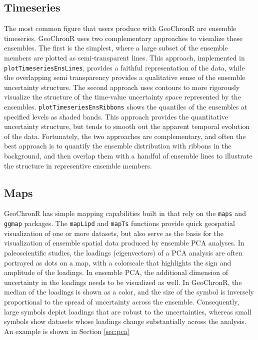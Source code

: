 \documentclass[gchron, manuscript]{copernicus}
\begin{document}
\subsection{Timeseries}

The most common figure that users produce with GeoChronR are ensemble timeseries.
GeoChronR uses two complementary approaches to visualize these ensembles.
The first is the simplest, where a large subset of the ensemble members are plotted as semi-transparent lines.
This approach, implemented in \texttt{plotTimeseriesEnsLines}, provides a faithful representation of the data, while the overlapping semi transparency provides a qualitative sense of the ensemble uncertainty structure.
The second approach uses contours to more rigorously visualize the structure of the time-value uncertainty space represented by the ensembles.
\texttt{plotTimeseriesEnsRibbons} shows the quantiles of the ensembles at specified levels as shaded bands.
This approach provides the quantitative uncertainty structure, but tends to smooth out the apparent temporal evolution of the data.
Fortunately, the two approaches are complementary, and often the best approach is to quantify the ensemble distribution with ribbons in the background, and then overlap them with a handful of ensemble lines to illustrate the structure in representive ensemble members.

\subsection{Maps}

GeoChronR has simple mapping capabilities built in that rely on the \texttt{maps} \citep{maps} and \texttt{ggmap} \citep{ggmap} packages.
The \texttt{mapLipd} and \texttt{mapTs} functions provide quick geospatial visualization of one or more datasets, but also serve as the basis for the visualization of ensemble spatial data produced by ensemble PCA analyses.
In paleoscientific studies, the loadings (eigenvectors) of a PCA analysis are often portrayed as dots on a map, with a colorscale that highlights the sign and amplitude of the loadings.
In ensemble PCA, the additional dimension of uncertainty in the loadings needs to be visualized as well.
In GeoChronR, the median of the loadings is shown as a color, and the size of the symbol is inversely proportional to the spread of uncertainty across the ensemble.
Consequently, large symbols depict loadings that are robust to the uncertainties, whereas small symbols show datasets whose loadings change substantially across the analysis.
An example is shown in Section \ref{sec:pca}
\end{document}
